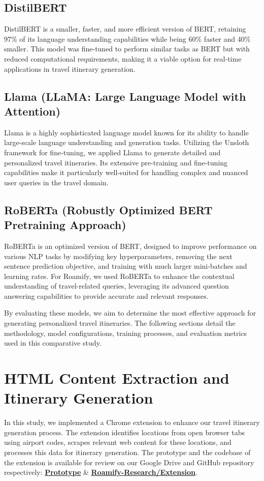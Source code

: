 \documentclass[conference]{IEEEtran}
\begin{document}
    \subsection{DistilBERT}
        DistilBERT is a smaller, faster, and more efficient version of BERT, retaining 97\% of its language understanding capabilities while being 60\% faster and 40\% smaller. This model was fine-tuned to perform similar tasks as BERT but with reduced computational requirements, making it a viable option for real-time applications in travel itinerary generation.

    \subsection{Llama (LLaMA: Large Language Model with Attention)}
        Llama is a highly sophisticated language model known for its ability to handle large-scale language understanding and generation tasks. Utilizing the Unsloth framework for fine-tuning, we applied Llama to generate detailed and personalized travel itineraries. Its extensive pre-training and fine-tuning capabilities make it particularly well-suited for handling complex and nuanced user queries in the travel domain.

    \subsection{RoBERTa (Robustly Optimized BERT Pretraining Approach)}
        RoBERTa is an optimized version of BERT, designed to improve performance on various NLP tasks by modifying key hyperparameters, removing the next sentence prediction objective, and training with much larger mini-batches and learning rates. For Roamify, we used RoBERTa to enhance the contextual understanding of travel-related queries, leveraging its advanced question answering capabilities to provide accurate and relevant responses.

    By evaluating these models, we aim to determine the most effective approach for generating personalized travel itineraries. The following sections detail the methodology, model configurations, training processes, and evaluation metrics used in this comparative study.


\section{HTML Content Extraction and Itinerary Generation}

    In this study, we implemented a Chrome extension to enhance our travel itinerary generation process. The extension identifies locations from open browser tabs using airport codes, scrapes relevant web content for these locations, and processes this data for itinerary generation.
    The prototype and the codebase of the extension is available for review on our Google Drive and GitHub repository respectively: \href{https://drive.google.com/drive/folders/1LXkF0hXtUz9cSrduAqgJe9TYU8Me2wMg?usp=sharing}{\textbf{Prototype}} \& \href{hhttps://github.com/Roamify-Research/Extension}{\textbf{Roamify-Research/Extension}}.
\end{document}
